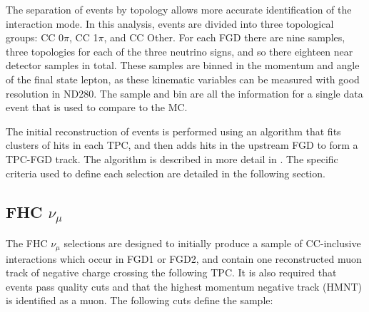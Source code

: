 The separation of events by topology allows more accurate identification of the interaction mode. In this analysis, events are divided into three topological groups: CC 0$\pi$, CC 1$\pi$, and CC Other. For each FGD there are nine samples, three topologies for each of the three neutrino signs, and so there eighteen near detector samples in total. These samples are binned in the momentum and angle of the final state lepton, as these kinematic variables can be measured with good resolution in ND280. The sample and bin are all the information for a single data event that is used to compare to the MC. 

The initial reconstruction of events is performed using an algorithm that fits clusters of hits in each TPC, and then adds hits in the upstream FGD to form a TPC-FGD track. The algorithm is described in more detail in \cite{tn212}. The specific criteria used to define each selection are detailed in the following section. 

\subsection{FHC $\nu_{\mu}$}

The FHC $\nu_{\mu}$ selections are designed to initially produce a sample of CC-inclusive interactions which occur in FGD1 or FGD2, and contain one reconstructed muon track of negative charge crossing the following TPC. It is also required that events pass quality cuts and that the highest momentum negative track (HMNT) is identified as a muon. The following cuts define the sample:

